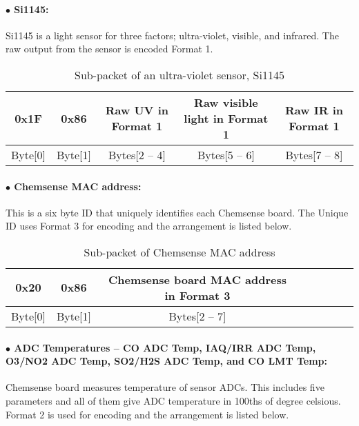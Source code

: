 \paragraph{$\bullet$ Si1145:}
Si1145 is a light sensor for three factors; ultra-violet, visible, and infrared. 
The raw output from the sensor is encoded Format 1.

\begin{table}[h!]
    \centering
    \caption{Sub-packet of an ultra-violet sensor, Si1145}
    \begin{tabular}{|c|c|c|c|c|}
        \hline
        \rowcolor{black!8}
        \textbf{0x1F} & \textbf{0x86} & \textbf{Raw UV in Format 1} & \textbf{Raw visible light in Format 1} & \textbf{Raw IR in Format 1}\\
        \hline
        Byte[0] & Byte[1] & Bytes[2 -- 4] & Bytes[5 -- 6] & Bytes[7 -- 8] \\ \hline
    \end{tabular}
\end{table}


\paragraph{$\bullet$ Chemsense MAC address:}

This is a six byte ID that uniquely identifies each Chemsense board. The Unique ID uses Format 3
for encoding and the arrangement is listed below.


\begin{table}[h!]
    \centering
    \caption{Sub-packet of Chemsense MAC address}
    \begin{tabular}{|c|c|c|c|c|c|c|c|}
        \hline
        \rowcolor{black!8}
        \textbf{0x20} & \textbf{0x86} & \textbf{Chemsense board MAC address in Format 3}\\
        \hline
        Byte[0] & Byte[1] & Bytes[2 -- 7] \\ \hline
    \end{tabular}
\end{table}


\paragraph{$\bullet$ ADC Temperatures -- CO ADC Temp, IAQ/IRR ADC Temp, O3/NO2 ADC Temp, SO2/H2S ADC Temp, and CO LMT Temp:}
Chemsense board measures temperature of sensor ADCs. This includes five parameters and 
all of them give ADC temperature in 100ths of degree celsious. Format 2 is used for encoding and the arrangement is listed below. 


